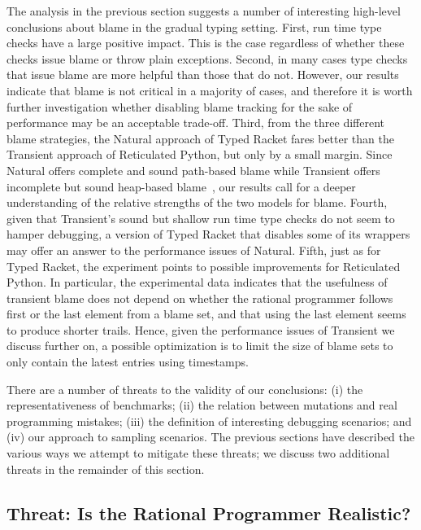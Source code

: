 


The analysis in the previous section suggests a number of interesting
high-level conclusions about blame in the gradual typing setting.  First,
run time type checks have a large positive impact. This is the case
regardless of whether these checks issue blame or throw plain exceptions.
Second, in many cases type checks that issue blame are more helpful than
those that do not. However, our results indicate that blame
is not critical in a majority of cases, and therefore it is worth further investigation whether
disabling blame tracking for the sake of performance may be   an
acceptable trade-off. Third, from the three different blame strategies, the
Natural approach of Typed Racket fares better than the Transient approach
of Reticulated Python, but only by a small margin. Since Natural offers complete
and sound path-based blame while Transient offers incomplete but sound heap-based
blame~\cite{gfd-oopsla-2019}, our results call for a deeper understanding
of the relative strengths of the two models for blame.  Fourth, given that
Transient's sound but shallow run time type checks do not seem to hamper
debugging, a version of Typed Racket that disables some of its wrappers
may offer an answer to the performance issues of Natural. 
Fifth, just as for Typed Racket, the experiment points to possible
improvements for Reticulated Python. In particular, the experimental 
data indicates that the usefulness of transient blame does not depend on
whether  the rational programmer follows first or the last element from a
blame set, and that using the last element seems to produce shorter trails.
Hence, given the performance issues of Transient we discuss further on,
a possible optimization is to limit the size of blame sets
to only contain the latest entries using timestamps.

There are a number of threats to the validity of our conclusions: (i) the
representativeness of benchmarks; (ii) the relation between mutations and
real programming mistakes; (iii) the definition of interesting debugging
scenarios; and (iv) our approach to sampling scenarios. The previous sections
have described the various ways we attempt to mitigate these threats;
we discuss two additional threats in the remainder of this section.

\subsection{Threat: Is the Rational Programmer Realistic?}


